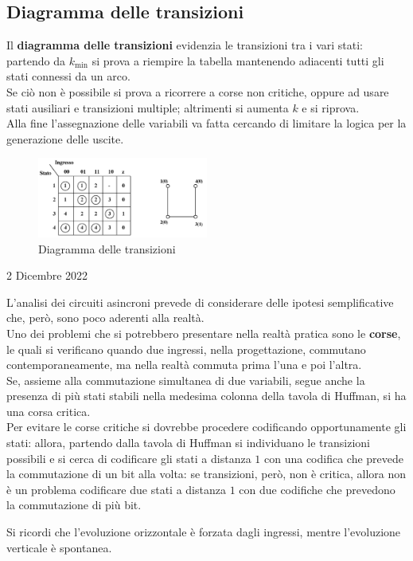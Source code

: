 \documentclass[a4paper]{extarticle}
\begin{document}
\vspace{1em}
\subsection{Diagramma delle transizioni}
Il \textbf{diagramma delle transizioni} evidenzia le transizioni tra i vari stati: partendo da $k_{\min}$ si prova a riempire la tabella mantenendo adiacenti tutti gli stati connessi da un arco.\\
Se ciò non è possibile si prova a ricorrere a corse non critiche, oppure ad usare stati ausiliari e transizioni multiple; altrimenti si aumenta $k$ e si riprova.\\
Alla fine l'assegnazione delle variabili va fatta cercando di limitare la logica per la generazione delle uscite.

\begin{figure}[H]
    \centering
    \includegraphics[width=0.50\textwidth]{diagramma-transizioni.png}
    \caption{Diagramma delle transizioni}
    \label{fig:diagramma_transizioni}
\end{figure}

\newpage
\begin{center}
    2 Dicembre 2022
\end{center}
L'analisi dei circuiti asincroni prevede di considerare delle ipotesi semplificative che, però, sono poco aderenti alla realtà.\\
Uno dei problemi che si potrebbero presentare nella realtà pratica sono le \textbf{corse}, le quali si verificano quando due ingressi, nella progettazione, commutano contemporaneamente, ma nella realtà commuta prima l'una e poi l'altra.\\
Se, assieme alla commutazione simultanea di due variabili, segue anche la presenza di più stati stabili nella medesima colonna della tavola di Huffman, si ha una corsa critica.\\
Per evitare le corse critiche si dovrebbe procedere codificando opportunamente gli stati: allora, partendo dalla tavola di Huffman si individuano le transizioni possibili e
si cerca di codificare gli stati a distanza $1$ con una codifica che prevede la commutazione di un bit alla volta: se transizioni, però, non è critica, allora non è un problema codificare due stati a distanza $1$ con due codifiche che prevedono la commutazione di più bit.

\vspace{2em}
\noindent
Si ricordi che l'evoluzione orizzontale è forzata dagli ingressi, mentre l'evoluzione verticale è spontanea.\\
\end{document}

